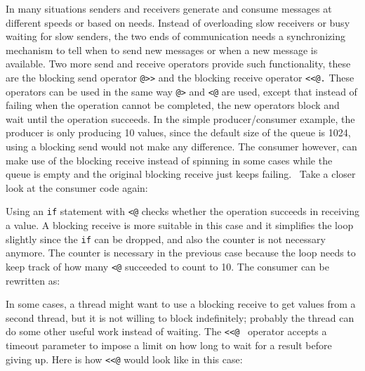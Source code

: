 In many situations senders and receivers generate and consume messages
at different speeds or based on needs. Instead of overloading slow
receivers or busy waiting for slow senders, the two ends of
communication needs a synchronizing mechanism to tell when to send new
messages or when a new message is available. Two more send and receive
operators provide such functionality, these are the blocking send
operator \texttt{@{\textgreater}{\textgreater}} and the
blocking receive operator
\texttt{{\textless}{\textless}@.} These operators can
be used in the same way \texttt{@{\textgreater}} and
\texttt{{\textless}@} are used, except that instead of
failing when the operation cannot be completed, the new operators block
and wait until the operation succeeds. In the simple producer/consumer
example, the producer is only producing 10 values, since the default
size of the queue is 1024, using a blocking send would not make any
difference. The consumer however, can make use of the blocking receive
instead of spinning in some cases while the queue is empty and the
original blocking receive just keeps failing. \ Take a closer look at
the consumer code again:


Using an \texttt{if} statement with
\texttt{{\textless}@}  checks whether the
operation succeeds in receiving a value. A blocking receive is more
suitable in this case and it simplifies the loop slightly since the
\texttt{if} can be dropped, and also the counter is not
necessary anymore. The counter is necessary in the previous case
because the loop needs to keep track of how many
\texttt{{\textless}@} succeeded to count to 10. The
consumer can be rewritten as:


In some cases, a thread might want to use a blocking receive to get
values from a second thread, but it is not willing to block
indefinitely; probably the thread can do some other useful work instead
of waiting. The \texttt{{\textless}{\textless}@}
\ operator accepts a timeout parameter to impose a limit on how long to
wait for a result before giving up. Here is how
\texttt{{\textless}{\textless}@} would look like in
this case:

